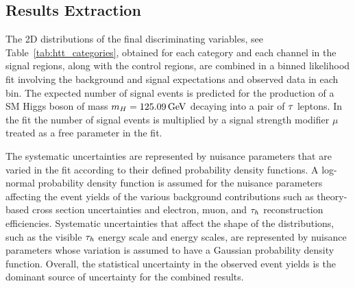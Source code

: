 %


\subsection{Results Extraction}
\label{sec:htt_fit_details}
The 2D distributions of the final discriminating variables, see Table~\ref{tab:htt_categories}, 
obtained for each category and each channel in the 
signal regions, along with the control regions, are combined in a binned likelihood fit involving the 
background and signal expectations and observed data in each bin.
The expected number of signal events is predicted for the production of
a SM Higgs boson of mass $m_{H}=125.09\,\mathrm{GeV}$ decaying into a pair of $\tau$ leptons. In the fit
the number of signal events is
multiplied by a signal strength modifier $\mu$ treated as a free parameter in the fit.

The systematic uncertainties are represented by nuisance parameters that are varied in the fit 
according to their defined probability density functions.
A log-normal probability density function is assumed for the nuisance parameters affecting the event yields 
of the various background contributions such as theory-based cross section uncertainties and
electron, muon, and $\tau_{h}$ reconstruction efficiencies. Systematic uncertainties that affect the shape of the 
distributions, such as the visible $\tau_{h}$ energy scale and \etvecmiss energy scales, are represented 
by nuisance parameters whose variation 
is assumed to have a Gaussian probability density function.
Overall, the statistical uncertainty in the observed event yields is the dominant source of uncertainty 
for the combined results.


